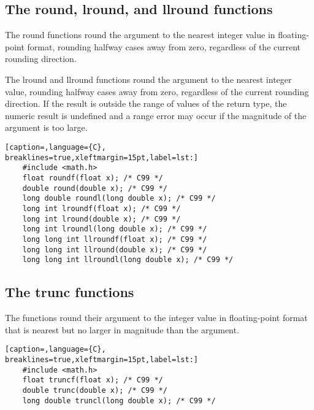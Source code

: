 \subsection{The round, lround, and llround functions}
The round functions round the argument to the nearest integer value in
floating-point format, rounding halfway cases away from zero, regardless of the
current rounding direction.

The lround and llround functions round the argument to the nearest integer
value, rounding halfway cases away from zero, regardless of the current
rounding direction. If the result is outside the range of values of the return
type, the numeric result is undefined and a range error may occur if the
magnitude of the argument is too large.

\lstset{basicstyle=\scriptsize, numbers=left, captionpos=b, tabsize=4}
\begin{lstlisting}[caption=,language={C},
breaklines=true,xleftmargin=15pt,label=lst:]
	#include <math.h>
	float roundf(float x); /* C99 */
	double round(double x); /* C99 */
	long double roundl(long double x); /* C99 */
	long int lroundf(float x); /* C99 */
	long int lround(double x); /* C99 */
	long int lroundl(long double x); /* C99 */
	long long int llroundf(float x); /* C99 */
	long long int llround(double x); /* C99 */
	long long int llroundl(long double x); /* C99 */
\end{lstlisting}

\subsection{The trunc functions}
The functions round their argument to the integer value in floating-point
format that is nearest but no larger in magnitude than the argument.
\lstset{basicstyle=\scriptsize, numbers=left, captionpos=b, tabsize=4}
\begin{lstlisting}[caption=,language={C},
breaklines=true,xleftmargin=15pt,label=lst:]
	#include <math.h>
	float truncf(float x); /* C99 */
	double trunc(double x); /* C99 */
	long double truncl(long double x); /* C99 */
\end{lstlisting}

